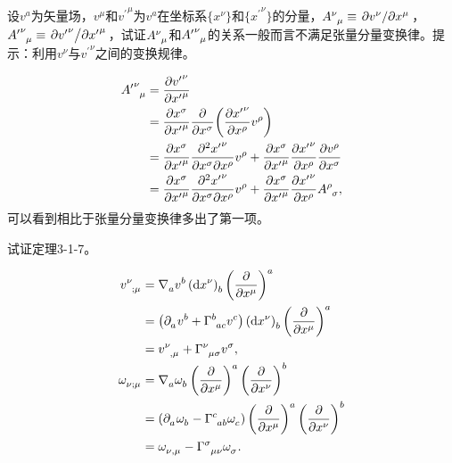 \begin{xiti}
	\item 设$v^a$为矢量场，$v^\mu $和${v^\prime}^\mu$为$v^a$在坐标系$\{x^\nu\}$和$\{{x^\prime}^\nu \} $的分量，$\tensor{A}{^\nu_\mu}\equiv \pdv*{v^\nu}{x^\mu} $，$\tensor{{A^\prime}}{^\nu_\mu}\equiv \pdv*{{v^\prime}^\nu}{{x^\prime}^\mu} $，试证$\tensor{A}{^\nu_\mu}$和$\tensor{{A^\prime}}{^\nu_\mu}$的关系一般而言不满足张量分量变换律。提示：利用$v^\nu $与${v^\prime}^\nu $之间的变换规律。

	\begin{zm}
		\begin{align*}
		\tensor{{A^\prime}}{^\nu_\mu}=&\;\pdv{{v^\prime}^\nu}{{x^\prime}^\mu}\\
		=&\;\pdv{x^\sigma}{{x^\prime}^\mu}\pdv{x^\sigma}(\pdv{{x^\prime}^\nu}{x^\rho}v^\rho)\\
		=&\;\pdv{x^\sigma}{{x^\prime}^\mu}\pdv{{x^\prime}^\nu}{x^\sigma}{x^\rho}v^\rho +\pdv{x^\sigma}{{x^\prime}^\mu}\pdv{{x^\prime}^\nu}{x^\rho}\pdv{v^\rho}{x^\sigma}\\
		=&\;\pdv{x^\sigma}{{x^\prime}^\mu}\pdv{{x^\prime}^\nu}{x^\sigma}{x^\rho}v^\rho +\pdv{x^\sigma}{{x^\prime}^\mu}\pdv{{x^\prime}^\nu}{x^\rho}\tensor{A}{^\rho_\sigma},
		\end{align*}
		可以看到相比于张量分量变换律多出了第一项。
	\end{zm}

	\item 试证定理3-1-7。

	\begin{zm}
		\begin{align*}
		\tensor{v}{^\nu_{;\mu}}=&\; \Nabla{a}\tensor{v}{^b}\tensor{\left(\dd{x^\nu}\right)}{_b}\tensor{\left(\pdv{x^\mu}\right)}{^a}\\
		=&\tmu \left( \Partial{a}v^b+\ChristoffelSymbol{b}{a}{c}v^c \right)\tensor{\left(\dd{x^\nu}\right)}{_b}\tensor{\left(\pdv{x^\mu}\right)}{^a}\\
		=&\; \tensor{v}{^\nu_{,\mu}}+\ChristoffelSymbol{\nu}{\mu}{\sigma}\tensor{v}{^\sigma},\\
		\tensor{\omega}{_\nu_{;\mu}}=&\; \Nabla{a}\tensor{\omega}{_b}\tensor{\left(\pdv{x^\mu}\right)}{^a}\tensor{\left(\pdv{x^\nu}\right)}{^b}\\
		=&\tmu \left(\Partial{a}\tensor{\omega}{_b}-\ChristoffelSymbol{c}{a}{b}\tensor{\omega}{_c} \right)\tensor{\left(\pdv{x^\mu}\right)}{^a}\tensor{\left(\pdv{x^\nu}\right)}{^b}\\
		=&\; \tensor{\omega}{_\nu_{,\mu}}-\ChristoffelSymbol{\sigma}{\mu}{\nu}\tensor{\omega}{_\sigma}.
		\end{align*}
	\end{zm}


\end{xiti}
